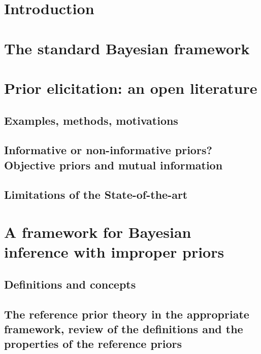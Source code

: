 


\section{Introduction}

\section{The standard Bayesian framework}

\section{Prior elicitation: an open literature}

\subsection{Examples, methods, motivations}

\subsection{Informative or non-informative priors? Objective priors and mutual information}


\subsection{Limitations of the State-of-the-art}

\section{A framework for Bayesian inference with improper priors}

\subsection{Definitions and concepts}


\subsection{The reference prior theory in the appropriate framework, review of the definitions and the properties of the reference priors}




